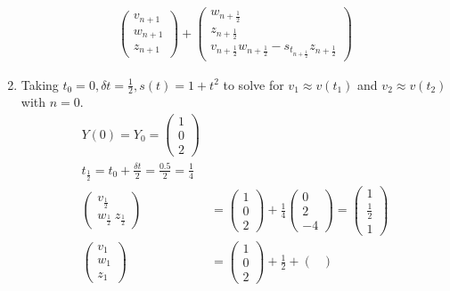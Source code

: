\documentclass[12pt,a4paper]{article}
\begin{document}
\begin{enumerate}
\begin{align*}
\begin{pmatrix}
      v_{n+1}\\
      w_{n+1}\\
      z_{n+1}
   \end{pmatrix} +   \begin{pmatrix}
        w_{n  + \frac{1}{2}}\\
        z_{n  + \frac{1}{2}}\\
        v_{n  + \frac{1}{2}} w_{n  + \frac{1}{2}} -  s_{t_{n  + \frac{1}{2}}}  z_{n  + \frac{1}{2}}
   \end{pmatrix}
\end{align*}
\item Taking $t_0  = 0,  \delta t  = \frac{1}{2} ,  s(t)    =  1+ t^2$ to solve for $v_1  \approx v( t_1) $ and $v_2  \approx   v(t_2) $ with $n =  0$.
\begin{align*}
  Y(0)   =  Y_0   = \begin{pmatrix}
     1\\
     0\\
     2
  \end{pmatrix}\\
  t_{\frac{1}{2}}  =  t_0  + \frac{\delta t}{2}   =  \frac{0.5}{2}   =  \frac{1}{4}\\
  \begin{pmatrix}
     v_{\frac{1}{2}}   \\
     w_{\frac{1}{2}}\
     z_{\frac{1}{2}}
  \end{pmatrix} &=  \begin{pmatrix}
    1\\
    0\\
    2
  \end{pmatrix}     + \frac{1}{4}  \begin{pmatrix}
     0\\
     2\\
     -4
  \end{pmatrix}  =  \begin{pmatrix}
    1\\
    \frac{1}{2}\\
    1
  \end{pmatrix}\\
  \begin{pmatrix}
   v_1\\
   w_1  \\
   z_1 
  \end{pmatrix}  &=    \begin{pmatrix}
    1\\
    0\\
    2
  \end{pmatrix}   + \frac{1}{2}    + \begin{pmatrix}

\end{pmatrix}
\end{align*}
\end{enumerate}
\end{document}
